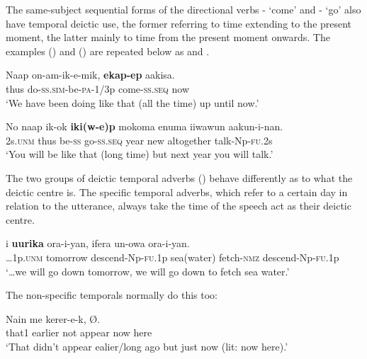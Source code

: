 The same-subject sequential forms of the directional verbs - `come' and - `go' also have temporal deictic use, the former referring to time extending to the present moment, the latter mainly to time from the present moment onwards. The examples () and () 
are repeated below as  and .

\ea%
\label{ex:x1941}
\gll Naap  on-am-ik-e-mik,  \textbf{ekap-ep} aakisa. \\
thus  do-\textsc{ss}.\textsc{sim}-be-\textsc{pa}-1/3p  come-\textsc{ss}.\textsc{seq}  now\\
\glt `We have been doing like that (all the time) up until now.'
\z

\ea%
\label{ex:x1942}
\gll No  naap  ik-ok  \textbf{iki(w-e)p}  mokoma  enuma  iiwawun aakun-i-nan.\\
2s.\textsc{unm}  thus  be-\textsc{ss}  go-\textsc{ss}.\textsc{seq}  year  new  altogether talk-Np-\textsc{fu}.2s\\
\glt `You will be like that (long time) but next year you will talk.'
\z

The two groups of deictic temporal adverbs () behave differently as to what the deictic centre is. The specific temporal adverbs, which refer to a certain day in relation to the utterance, always take the time of the speech act as their deictic centre. 

\ea%
\label{ex:x1889}
\gll {\dots}i  \textbf{uurika}  ora-i-yan,  ifera  un-owa ora-i-yan.\\
{\dots}1p.\textsc{unm}  tomorrow  descend-Np-\textsc{fu}.1p  sea(water)  fetch-\textsc{nmz} descend-Np-\textsc{fu}.1p\\
\glt `{\dots}we will go down tomorrow, we will go down to fetch sea water.'
\z

The non-specific temporals normally do this too: 

\ea%
\label{ex:x1890}
\gll Nain    me  kerer-e-k,     {\O}. \\
that1  earlier  not  appear  now  here \\
\glt `That didn't appear ealier/long ago but just now (lit: now here).'
\z

